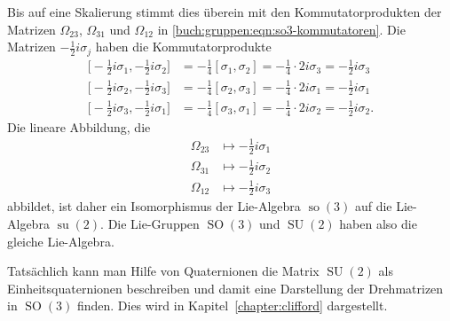Bis auf eine Skalierung stimmt dies überein mit den Kommutatorprodukten
der Matrizen $\Omega_{23}$, $\Omega_{31}$ und $\Omega_{12}$
in \eqref{buch:gruppen:eqn:so3-kommutatoren}.
Die Matrizen $-\frac12i\sigma_j$ haben die Kommutatorprodukte
\begin{align*}
\bigl[-{\textstyle\frac12}i\sigma_1,-{\textstyle\frac12}i\sigma_2\bigr]
&=
-{\textstyle\frac14}[\sigma_1,\sigma_2]
=
-{\textstyle\frac14}\cdot 2i\sigma_3
=
-{\textstyle\frac12}i\sigma_3
\\
\bigl[-{\textstyle\frac12}i\sigma_2,-{\textstyle\frac12}i\sigma_3\bigr]
&=
-{\textstyle\frac14}[\sigma_2,\sigma_3]
=
-{\textstyle\frac14}\cdot 2i\sigma_1
=
-{\textstyle\frac12}i\sigma_1
\\
\bigl[-{\textstyle\frac12}i\sigma_3,-{\textstyle\frac12}i\sigma_1\bigr]
&=
-{\textstyle\frac14}[\sigma_3,\sigma_1]
=
-{\textstyle\frac14}\cdot 2i\sigma_2
=
-{\textstyle\frac12}i\sigma_2.
\end{align*}
Die lineare Abbildung, die
\begin{align*}
\Omega_{23}&\mapsto -{\textstyle\frac12}i\sigma_1\\
\Omega_{31}&\mapsto -{\textstyle\frac12}i\sigma_2\\
\Omega_{12}&\mapsto -{\textstyle\frac12}i\sigma_3
\end{align*}
abbildet, ist daher ein Isomorphismus der Lie-Algebra $\operatorname{so}(3)$
auf die Lie-Algebra $\operatorname{su}(2)$.
Die Lie-Gruppen $\operatorname{SO}(3)$ und $\operatorname{SU}(2)$
haben also die gleiche Lie-Algebra.

Tatsächlich kann man Hilfe von Quaternionen die Matrix $\operatorname{SU}(2)$
als Einheitsquaternionen beschreiben und damit eine Darstellung der
Drehmatrizen in $\operatorname{SO}(3)$ finden.
Dies wird in Kapitel~\ref{chapter:clifford} dargestellt.





